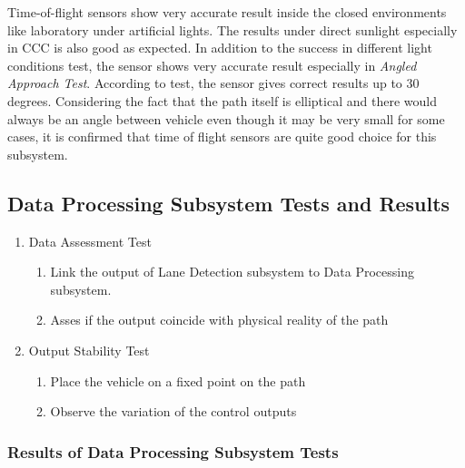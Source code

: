 \documentclass[a4paper,12pt]{article}
\begin{document}
	Time-of-flight sensors show very accurate result inside the closed environments like laboratory under artificial lights. The results under direct sunlight especially in CCC is also good as expected. In addition to the success in different light conditions test, the sensor shows very accurate result especially in \textit{Angled Approach Test}. According to test, the sensor gives correct results up to 30 degrees. Considering the fact that the path itself is elliptical and there would always be an angle between vehicle even though it may be very small for some cases, it is confirmed that time of flight sensors are quite good choice for this subsystem. 
	




\subsection {Data Processing Subsystem Tests and Results}	

\begin{enumerate}

\item Data Assessment Test

\begin{enumerate}

\item Link the output of Lane Detection subsystem to Data Processing subsystem.  

\item Asses if the output coincide with physical reality of the path  

\end{enumerate}

\item Output Stability Test

\begin{enumerate}
	
	\item Place the vehicle on a fixed point on the path
	
	\item Observe the variation of the control outputs
	
\end{enumerate}

\end{enumerate}
\subsubsection*{Results of Data Processing Subsystem Tests}\label{sec:DataProcessingSubsystemTests}
\end{document}
